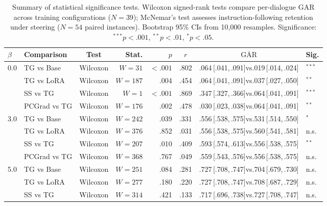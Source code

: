 \begin{table}[t]
\centering
\caption{Summary of statistical significance tests.
  Wilcoxon signed-rank tests compare per-dialogue GAR across training configurations ($N\!=\!39$);
  McNemar's test assesses instruction-following retention under steering ($N\!=\!54$ paired instances).
  Bootstrap 95\% CIs from 10{,}000 resamples.
  Significance: $^{***}\!p<.001$, $^{**}\!p<.01$, $^{*}\!p<.05$.}
\label{tab:statistical_tests}
\small
\setlength{\tabcolsep}{4pt}
\begin{tabular}{@{}llcrrccl@{}}
\toprule
$\beta$ & Comparison & Test & Stat. & $p$ & $r$ & $\overline{\mathrm{GAR}}$\;[95\% CI] & Sig. \\
\midrule
\multirow{4}{*}{0.0}
 & TG vs Base    & Wilcoxon & $W\!=\!31$  & ${<}.001$ & .802 & .064\,[.041,\,.091]\;vs\;.019\,[.014,\,.024] & $^{***}$ \\
 & TG vs LoRA    & Wilcoxon & $W\!=\!187$ & .004      & .454 & .064\,[.041,\,.091]\;vs\;.037\,[.027,\,.050] & $^{**}$  \\
 & SS vs TG      & Wilcoxon & $W\!=\!1$   & ${<}.001$ & .869 & .347\,[.327,\,.366]\;vs\;.064\,[.041,\,.091] & $^{***}$ \\
 & PCGrad vs TG  & Wilcoxon & $W\!=\!176$ & .002      & .478 & .030\,[.023,\,.038]\;vs\;.064\,[.041,\,.091] & $^{**}$  \\
\midrule
\multirow{4}{*}{3.0}
 & TG vs Base    & Wilcoxon & $W\!=\!242$ & .039 & .331 & .556\,[.538,\,.575]\;vs\;.531\,[.514,\,.550] & $^{*}$  \\
 & TG vs LoRA    & Wilcoxon & $W\!=\!376$ & .852 & .031 & .556\,[.538,\,.575]\;vs\;.560\,[.541,\,.581] & n.s.    \\
 & SS vs TG      & Wilcoxon & $W\!=\!207$ & .010 & .409 & .593\,[.574,\,.613]\;vs\;.556\,[.538,\,.575] & $^{**}$ \\
 & PCGrad vs TG  & Wilcoxon & $W\!=\!368$ & .767 & .049 & .559\,[.543,\,.576]\;vs\;.556\,[.538,\,.575] & n.s.    \\
\midrule
\multirow{4}{*}{5.0}
 & TG vs Base    & Wilcoxon & $W\!=\!251$ & .084 & .281 & .727\,[.708,\,.747]\;vs\;.704\,[.679,\,.730] & n.s. \\
 & TG vs LoRA    & Wilcoxon & $W\!=\!277$ & .180 & .220 & .727\,[.708,\,.747]\;vs\;.708\,[.687,\,.729] & n.s. \\
 & SS vs TG      & Wilcoxon & $W\!=\!314$ & .421 & .133 & .717\,[.696,\,.738]\;vs\;.727\,[.708,\,.747] & n.s. \\

\end{tabular}
\end{table}
